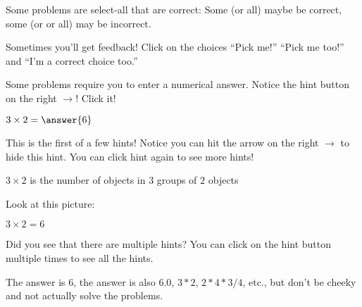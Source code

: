 \documentclass{ximera}
\begin{document}
 
\begin{example}
  Some problems are select-all that are correct: Some (or all) maybe be correct, some (or or all) may be incorrect.

  \begin{selectAll}
  \end{selectAll}
  \begin{feedback}
    Sometimes you'll get feedback! Click on the choices ``Pick me!'' ``Pick me too!'' and ``I'm a correct choice too.''
  \end{feedback}
\end{example}
 
 
\begin{example}
  Some problems require you to enter a numerical answer. Notice the hint button on the right $\rightarrow$! Click it!

  $3\times 2 = \answer{6}$ 

  \begin{hint}
    This is the first of a few hints! Notice you can hit the arrow on the right $\rightarrow$ to hide this hint. You can click hint again to see more hints!
  \end{hint}
  \begin{hint}
    $3 \times 2$ is the number of objects in $3$ groups of $2$ objects
  \end{hint}
  \begin{hint}
    Look at this picture:
    \begin{image}
    \end{image}
  \end{hint}
  \begin{hint}
    $3\times 2=6$
  \end{hint}
  \begin{feedback}
    Did you see that there are multiple hints? You can click on the hint button multiple times to see all the hints.

    The answer is $6$, the answer is also $6.0$, $3*2$, $2*4*3/4$, etc., but don't be cheeky and not actually solve the problems.
  \end{feedback}
\end{example}
 
\end{document}
